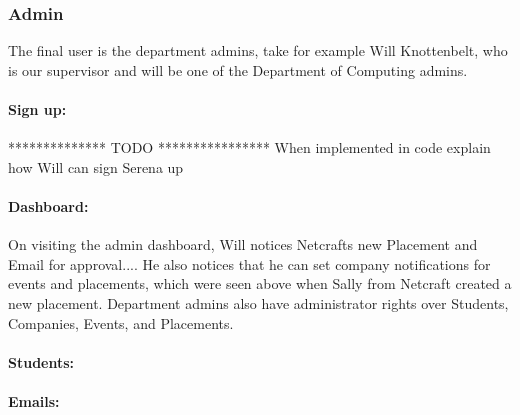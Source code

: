 \subsubsection{Admin}
  The final user is the department admins, take for example Will Knottenbelt, who is our supervisor and will be one of the Department of Computing admins.
  \paragraph{Sign up:}
    ************** TODO ****************
    When implemented in code explain how Will can sign Serena up

  \paragraph{Dashboard:}
    On visiting the admin dashboard, Will notices Netcrafts new Placement and Email for approval....
    He also notices that he can set company notifications for events and placements, which were seen above when Sally from Netcraft created a new placement.
    Department admins also have administrator rights over Students, Companies, Events, and Placements.


  \paragraph{Students:}

  \paragraph{Emails:}

